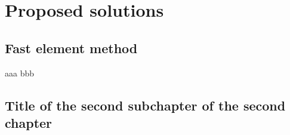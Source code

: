 \chapter{Proposed solutions}

\section{Fast element method}
aaa \cite{edem} bbb
\section{Title of the second subchapter of the second chapter}
